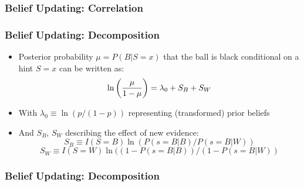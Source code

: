 \documentclass[11pt,hyperref={bookmarks=false}]{beamer}
\begin{document}

\begin{frame}
\frametitle{Belief Updating: Correlation}


\end{frame}

\begin{frame}
\frametitle{Belief Updating: Decomposition}
\begin{itemize}
\item Posterior probability $\mu=P(B|S=x)$ that the ball is black conditional on a hint $S=x$ can be written as:
$$\ln \left({\mu \over 1-\mu} \right)=\lambda_0+S_B+S_W$$
\item With $\lambda_0\equiv \ln(p/(1-p))$ representing (transformed) prior beliefs
\item And $S_B$, $S_W$ describing the effect of new evidence:
$$S_B\equiv I(S=B)\ln(P(s=B|B)/P(s=B|W))$$
$$S_W\equiv I(S=W)\ln((1-P(s=B|B))/(1-P(s=B|W))$$
\end{itemize}
\end{frame}


\begin{frame}
\frametitle{Belief Updating: Decomposition}

\end{frame}
\end{document}
